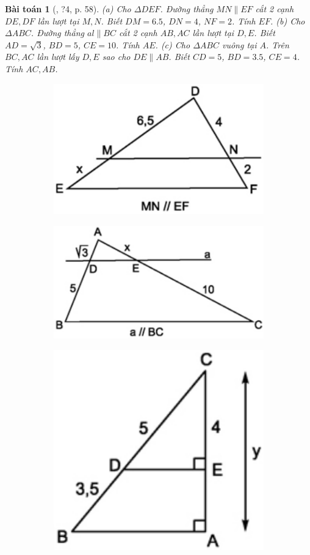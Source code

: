 \documentclass{article}
\newtheorem{baitoan}{Bài toán}
\begin{document}
\begin{baitoan}[\cite{SGK_Toan_8_tap_2}, ?4, p. 58]
	(a) Cho $\Delta DEF$. Đường thẳng $MN\parallel EF$ cắt 2 cạnh $DE,DF$ lần lượt tại $M,N$. Biết $DM = 6.5$, $DN = 4$, $NF = 2$. Tính $EF$. (b) Cho $\Delta ABC$. Đường thẳng $al\parallel BC$ cắt 2 cạnh $AB,AC$ lần lượt tại $D,E$. Biết $AD = \sqrt{3}$, $BD = 5$, $CE = 10$. Tính $AE$. (c) Cho $\Delta ABC$ vuông tại $A$. Trên $BC,AC$ lần lượt lấy $D,E$ sao cho $DE\parallel AB$. Biết $CD = 5$, $BD = 3.5$, $CE = 4$. Tính $AC,AB$.
	\begin{figure}[H]
		\centering
		\begin{subfigure}{.3\textwidth}
			\centering
			\includegraphics[width=.7\linewidth]{SGK_Toan_8_4}
		\end{subfigure}%
		\begin{subfigure}{.3\textwidth}
			\centering
			\includegraphics[width=.8\linewidth]{SGK_Toan_8_5a}
		\end{subfigure}%
		\begin{subfigure}{.3\textwidth}
			\centering
			\includegraphics[width=.5\linewidth]{SGK_Toan_8_5b}
		\end{subfigure}
	\end{figure}
\end{baitoan}
\end{document}

